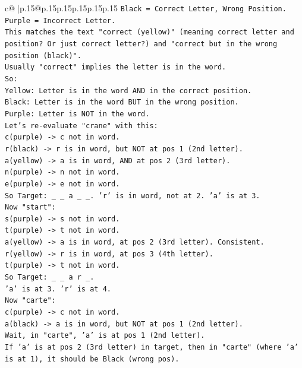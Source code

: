 \documentclass{article}
\begin{document}
{\begin{supertabular}{c@{$\;$}|p{.15\linewidth}@{}p{.15\linewidth}p{.15\linewidth}p{.15\linewidth}p{.15\linewidth}p{.15\linewidth}}
{{{\texttt{Black = Correct Letter, Wrong Position.} \\
\texttt{Purple = Incorrect Letter.} \\
\texttt{This matches the text "correct (yellow)" (meaning correct letter and position? Or just correct letter?) and "correct but in the wrong position (black)".} \\
\texttt{Usually "correct" implies the letter is in the word.} \\
\texttt{So:} \\
\texttt{Yellow: Letter is in the word AND in the correct position.} \\
\texttt{Black: Letter is in the word BUT in the wrong position.} \\
\texttt{Purple: Letter is NOT in the word.} \\
\texttt{Let's re{-}evaluate "crane" with this:} \\
\texttt{c(purple) {-}> c not in word.} \\
\texttt{r(black) {-}> r is in word, but NOT at pos 1 (2nd letter).} \\
\texttt{a(yellow) {-}> a is in word, AND at pos 2 (3rd letter).} \\
\texttt{n(purple) {-}> n not in word.} \\
\texttt{e(purple) {-}> e not in word.} \\
\texttt{So Target: \_ \_ a \_ \_. 'r' is in word, not at 2. 'a' is at 3.} \\
\texttt{Now "start":} \\
\texttt{s(purple) {-}> s not in word.} \\
\texttt{t(purple) {-}> t not in word.} \\
\texttt{a(yellow) {-}> a is in word, at pos 2 (3rd letter). Consistent.} \\
\texttt{r(yellow) {-}> r is in word, at pos 3 (4th letter).} \\
\texttt{t(purple) {-}> t not in word.} \\
\texttt{So Target: \_ \_ a r \_.} \\
\texttt{'a' is at 3. 'r' is at 4.} \\
\texttt{Now "carte":} \\
\texttt{c(purple) {-}> c not in word.} \\
\texttt{a(black) {-}> a is in word, but NOT at pos 1 (2nd letter).} \\
\texttt{Wait, in "carte", 'a' is at pos 1 (2nd letter).} \\
\texttt{If 'a' is at pos 2 (3rd letter) in target, then in "carte" (where 'a' is at 1), it should be Black (wrong pos).} \\
}}}
\end{supertabular}}
\end{document}
